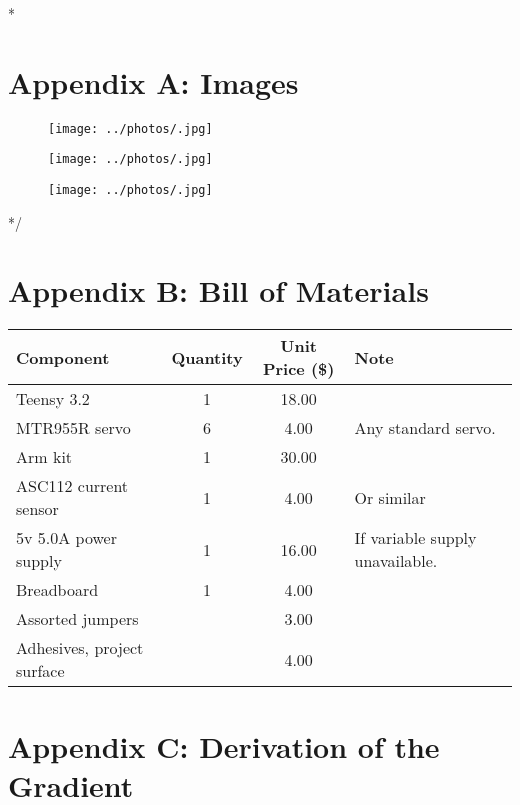 \documentclass{article}
\begin{document}
\clearpage

\/*
\section{Appendix A: Images}

	\begin{figure}[!htb]
		\centering
		\texttt{[image: ../photos/.jpg]}
		\label{fig:}
	\end{figure}
	
	\begin{figure}[!htb]
		\centering
		\texttt{[image: ../photos/.jpg]}
		\caption{}
		\label{fig:}
	\end{figure}
	
	\begin{figure}[!htb]
		\centering
		\texttt{[image: ../photos/.jpg]}
		\caption{}
		\label{fig:}
	\end{figure}
*/

\section{Appendix B: Bill of Materials}


\begin{center}
	\begin{tabular}{ l c c  p{5cm} }
		\toprule
		Component & Quantity & Unit Price (\$) & Note \\ \midrule
		Teensy 3.2 & 1 & 18.00 &  \\ 
		MTR955R servo & 6 & 4.00 & Any standard servo.\\ 
		Arm kit & 1 & 30.00 & \\
		ASC112 current sensor & 1 & 4.00 & Or similar\\
		5v 5.0A power supply & 1 & 16.00 & If variable supply unavailable. \\ 
		Breadboard & 1 & 4.00 & \\
		Assorted jumpers & & 3.00 & \\
		Adhesives, project surface & & 4.00 & \\
		\bottomrule
		
	\end{tabular}
\end{center}
	
\section{Appendix C: Derivation of the Gradient}
\end{document}
